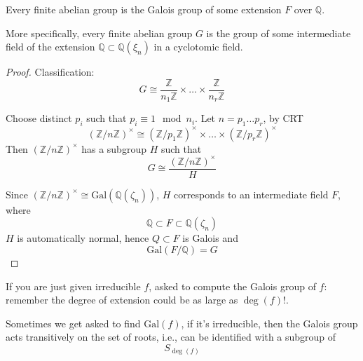 \documentclass[openany]{book}
\newcommand{\Z}{\mathbb{Z}}
\newcommand{\Q}{\mathbb{Q}}
\newcommand{\gal}{\text{Gal}}
\begin{document}
\begin{prop}
    Every finite abelian group is the Galois group of some extension $F$ over $\Q$. 

    More specifically, every finite abelian group $G$ is the group of some intermediate field of the extension $\Q\subset\Q(\xi_n)$ in a cyclotomic field.
\end{prop}
\begin{proof}
    Classification:
    \begin{equation*}
        G\cong\frac{\Z}{n_1\Z}\times\dots\times\frac{\Z}{n_r\Z}
    \end{equation*}

    Choose distinct $p_i$ such that $p_i\equiv 1\mod n_i$. Let $n=p_1\dots p_r$, by CRT 
    \begin{equation*}
        \left(\Z/n\Z\right)^\times\cong \left(\Z/p_1\Z\right)^\times\times\dots\times \left(\Z/p_r\Z\right)^\times
    \end{equation*}
    Then $\left(\Z/n\Z\right)^\times$ has a subgroup $H$ such that 
    \begin{equation*}
        G\cong\frac{\left(\Z/n\Z\right)^\times}{H}
    \end{equation*}
    

    Since $\left(\Z/n\Z\right)^\times\cong\gal(\Q(\zeta_n))$, $H$ corresponds to an intermediate field $F$, where 
    \begin{equation*}
        \Q\subset F\subset\Q(\zeta_n)
    \end{equation*}
    $H$ is automatically normal, hence $Q\subset F$ is Galois and 
    \begin{equation*}
        \gal(F/\Q)=G
    \end{equation*}
\end{proof}

\begin{warn}
    If you are just given irreducible $f$, asked to compute the Galois group of $f$: remember the degree of extension could be as large as $\deg(f)!$. 
\end{warn}

\begin{warn}
    Sometimes we get asked to find $\gal(f)$, if it's irreducible, then the Galois group acts transitively on the set of roots, i.e., can be identified with a subgroup of 
    \begin{equation*}
        S_{\deg(f)}
    \end{equation*}
\end{warn}
\end{document}

